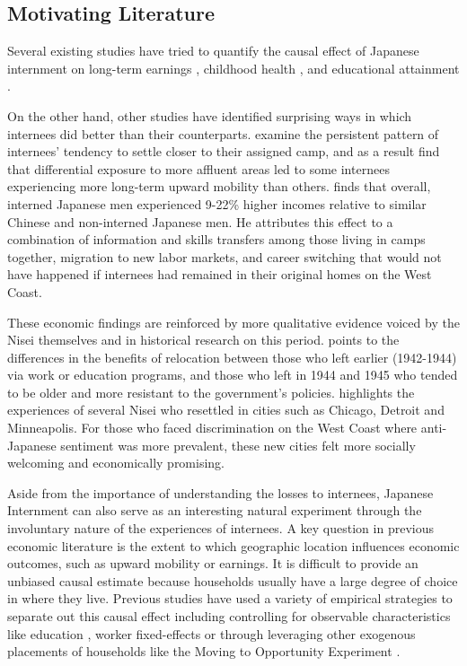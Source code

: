 \documentclass[12pt]{article}
\begin{document}
\subsection{Motivating Literature}
\label{sec:orga90653c}

Several existing studies have tried to quantify the causal effect
of Japanese internment on long-term earnings
\citep{chinLongRunLaborMarket2005},
childhood health
\citep{saavedraEarlyChildhoodConditions2013,grossmanIntergenerationalHealthEffects2025},
and educational attainment
\citep{saavedraSchoolQualityEducational2015}.

On the other hand, other studies have identified surprising ways
in which internees did better than their counterparts.
\citep{shoagCausalEffectPlace2016} examine the persistent pattern of
internees' tendency to settle closer to their assigned camp,
and as a result find that differential exposure to more affluent areas
led to some internees experiencing more long-term upward mobility than others.
\citep{arellano-boverDisplacementDiversityMobility2022} finds that overall,
interned Japanese men experienced 9-22\% higher incomes
relative to similar Chinese and non-interned Japanese men.
He attributes this effect to a combination of information and skills transfers
among those living in camps together,
migration to new labor markets, and career switching
that would not have happened if internees had remained in their original homes
on the West Coast.

These economic findings are reinforced by more qualitative evidence
voiced by the Nisei themselves
and in historical research on this period.
\citep{taylorLeavingConcentrationCamps1991}
points to the differences in the benefits of relocation between
those who left earlier (1942-1944) via work or education programs,
and those who left in 1944 and 1945 who tended to be older
and more resistant to the government's policies.
\citep{austinEastwardPioneersJapanese2007}
highlights the experiences of several Nisei who resettled in cities such as
Chicago, Detroit and Minneapolis.
For those who faced discrimination on the West Coast
where anti-Japanese sentiment was more prevalent,
these new cities felt more socially welcoming
and economically promising.

Aside from the importance of understanding the losses to internees, Japanese
Internment can also serve as an interesting natural experiment through the
involuntary nature of the experiences of internees.
A key question in previous economic literature is the extent to which
geographic location influences economic outcomes, such as upward mobility or earnings.
It is difficult to provide an unbiased causal estimate because households usually
have a large degree of choice in where they live. Previous studies have used a
variety of empirical strategies to separate out this causal effect including
controlling for observable characteristics like education
\citep{glaeserCitiesSkills2001}, worker fixed-effects or
through leveraging other exogenous placements of households like the Moving to
Opportunity Experiment
\citep{chettyEffectsExposureBetter2016}.
\end{document}
